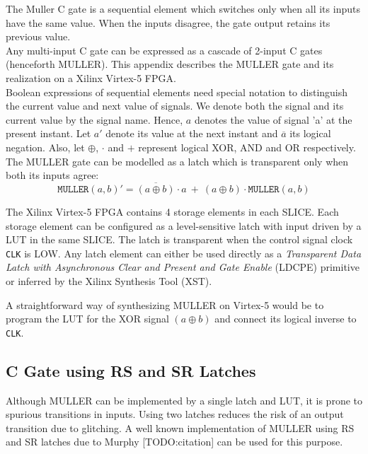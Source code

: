 The Muller C gate is a sequential element which switches only when all its inputs have
the same value.
When the inputs disagree, the gate output retains its previous value.
\\
Any multi-input C gate can be expressed as a cascade of 2-input C gates
(henceforth MULLER).
This appendix describes the MULLER gate and its realization on a Xilinx
Virtex-5 FPGA.
\\

Boolean expressions of sequential elements need special notation to distinguish the
current value and next value of signals. 
We denote both the signal and its current value by the signal name. 
Hence, $a$ denotes the value of signal 'a' at the present instant. 
Let $a'$ denote its value at the next instant and $\overline{a}$ its
logical negation.
Also, let $\oplus$, $\cdot$ and $+$ represent logical XOR, AND and OR respectively.
\\

The MULLER gate can be modelled as a latch which is transparent only when both
its inputs agree:
\begin{equation} \label{eq:muller_c}
	\texttt{MULLER}(a,b)' = 
	\overline{(a \oplus b)} \cdot a\ +\ (a \oplus b) \cdot \texttt{MULLER}(a,b)
\end{equation}

The Xilinx Virtex-5 FPGA contains 4 storage elements in each SLICE.
Each storage element can be configured as a level-sensitive latch with input
driven by a LUT in the same SLICE. The latch is transparent when the control
signal clock \texttt{CLK} is LOW. Any latch element can either be used directly
as a 
\textsl{Transparent Data Latch with Asynchronous Clear and Present and Gate
Enable} (LDCPE) primitive or inferred by the Xilinx Synthesis Tool (XST).

A straightforward way of synthesizing MULLER on Virtex-5 would be to program
the LUT for the XOR signal $(a \oplus b)$ and connect its logical inverse to
\texttt{CLK}.

\subsection{C Gate using RS and SR Latches}
Although MULLER can be implemented by a single latch and LUT, it is prone
to spurious transitions in inputs. 
Using two latches reduces the risk of an output transition due to glitching.
A well known implementation of MULLER using RS and SR latches due to Murphy
[TODO:citation] can be used for this purpose.

